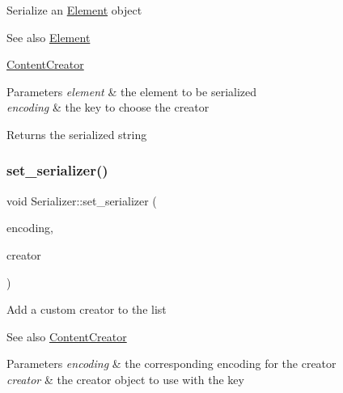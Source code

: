 Serialize an \mbox{\hyperlink{classElement}{Element}} object \begin{DoxySeeAlso}{See also}
\mbox{\hyperlink{classElement}{Element}} 

\mbox{\hyperlink{classContentCreator}{Content\+Creator}}
\end{DoxySeeAlso}

\begin{DoxyParams}{Parameters}
{\em element} & the element to be serialized \\
\hline
{\em encoding} & the key to choose the creator \\
\hline
\end{DoxyParams}
\begin{DoxyReturn}{Returns}
the serialized string 
\end{DoxyReturn}
\mbox{\label{classSerializer_a0258559787f09d3a7bfe6bb1c41cc118}} 
\subsubsection{\texorpdfstring{set\+\_\+serializer()}{set\_serializer()}}
{\footnotesize\ttfamily void Serializer\+::set\+\_\+serializer (\begin{DoxyParamCaption}\item[{const char $\ast$}]{encoding,  }\item[{\mbox{\hyperlink{classContentCreator}{Content\+Creator}} $\ast$}]{creator }\end{DoxyParamCaption})\hspace{0.3cm}{\ttfamily [inherited]}}

Add a custom creator to the list \begin{DoxySeeAlso}{See also}
\mbox{\hyperlink{classContentCreator}{Content\+Creator}}
\end{DoxySeeAlso}

\begin{DoxyParams}{Parameters}
{\em encoding} & the corresponding encoding for the creator \\
\hline
{\em creator} & the creator object to use with the key \\
\hline
\end{DoxyParams}
\mbox{\label{classSerializer_adf32dca6325e4a613c4c7ba48a3de244}} 
